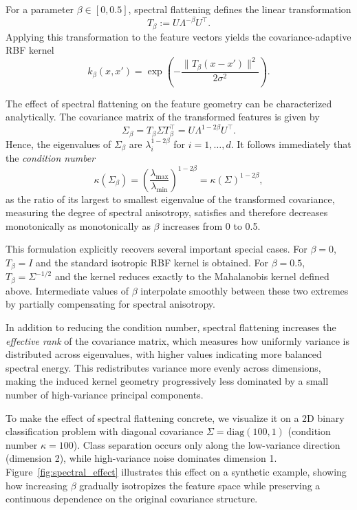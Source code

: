 \documentclass{article}
\begin{document}
For a parameter $\beta \in [0, 0.5]$, spectral flattening defines the linear transformation
\[
T_\beta := U \Lambda^{-\beta} U^\top.
\]
Applying this transformation to the feature vectors yields the covariance-adaptive RBF kernel
\[
k_\beta(x, x') 
= \exp\left(
    -\frac{\|T_\beta (x - x')\|^2}{2\sigma^2}
\right).
\]

The effect of spectral flattening on the feature geometry can be characterized analytically. The covariance matrix of the transformed features is given by
\[
\Sigma_\beta 
= T_\beta \Sigma T_\beta^\top
= U \Lambda^{1 - 2\beta} U^\top.
\]
Hence, the eigenvalues of $\Sigma_\beta$ are $\lambda_i^{1 - 2\beta}$ for $i = 1, \ldots, d$. It follows immediately that the \emph{condition number} 
\[
\kappa(\Sigma_\beta) = \left(\frac{\lambda_{\max}}{\lambda_{\min}}\right)^{1-2\beta}= \kappa(\Sigma)^{1 - 2\beta},
\]
as the ratio of its largest to smallest eigenvalue of the transformed covariance, measuring the degree of spectral anisotropy, satisfies and therefore decreases monotonically as monotonically as $\beta$ increases from 0 to 0.5.

This formulation explicitly recovers several important special cases. For $\beta = 0$, $T_\beta = I$ and the standard isotropic RBF kernel is obtained. For $\beta = 0.5$, $T_\beta = \Sigma^{-1/2}$ and the kernel reduces exactly to the Mahalanobis kernel defined above. Intermediate values of $\beta$ interpolate smoothly between these two extremes by partially compensating for spectral anisotropy.

In addition to reducing the condition number, spectral flattening increases the \emph{effective rank} of the covariance matrix, which measures how uniformly variance is distributed across eigenvalues, with higher values indicating more balanced spectral energy. This redistributes variance more evenly across dimensions, making the induced kernel geometry progressively less dominated by a small number of high-variance principal components. 

To make the effect of spectral flattening concrete, we visualize it on a 2D binary classification problem with diagonal covariance $\Sigma = \text{diag}(100, 1)$ (condition number $\kappa=100$). Class separation occurs only along the low-variance direction (dimension 2), while high-variance noise dominates dimension 1. Figure~\ref{fig:spectral_effect} illustrates this effect on a synthetic example, showing how increasing $\beta$ gradually isotropizes the feature space while preserving a continuous dependence on the original covariance structure.
\end{document}
